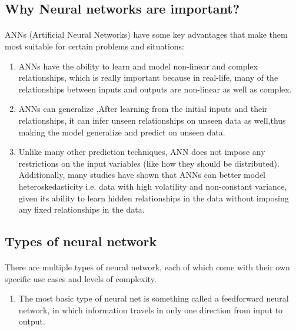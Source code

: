 \subsection{Why Neural networks are important? }
\paragraph{}
ANNs (Artificial Neural Networks) have some key advantages that make them most suitable for certain problems and situations:
\begin{enumerate}
	\item ANNs have the ability to learn and model non-linear and complex relationships, which is really important because in real-life, many of the relationships between inputs and outputs are non-linear as well as complex.
	\item ANNs can generalize ,After learning from the initial inputs and their relationships, it can infer unseen relationships on unseen data as well,thus making the model generalize and predict on unseen data.
	\item  Unlike many other prediction techniques, ANN does not impose any restrictions on the input variables (like how they should be distributed). Additionally, many studies have shown that ANNs can better model heteroskedasticity i.e. data with high volatility and non-constant variance, given its ability to learn hidden relationships in the data without imposing any fixed relationships in the data. 
	
\end{enumerate}
\subsection{Types of neural network }
\paragraph{}
There are multiple types of neural network, each of which come with their own specific use cases and levels of complexity.
\begin{enumerate}
	\item The most basic type of neural net is something called a feedforward neural network, in which information travels in only one direction from input to output.
\end{enumerate}


